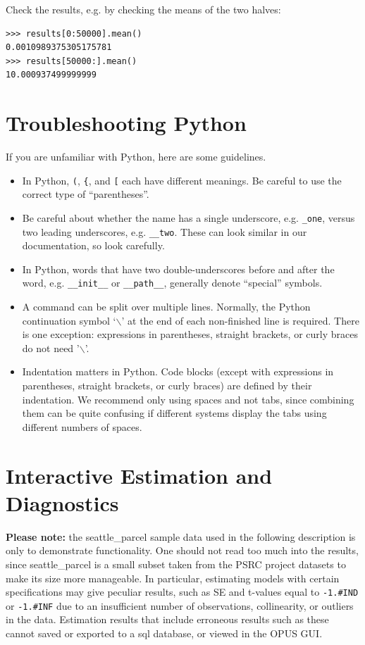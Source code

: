 Check the results, e.g. by checking the means of the two halves:
\begin{verbatim}
>>> results[0:50000].mean()
0.0010989375305175781
>>> results[50000:].mean()
10.000937499999999
\end{verbatim}

\section{Troubleshooting Python}
\label{sec:troubleshooting-python}

If you are unfamiliar with Python, here are some guidelines.

\begin{itemize}
  \item In Python, \verb|(|, \verb|{|, and \verb|[| each have different
  meanings.  Be careful to use the correct type of ``parentheses''.
  \item Be careful about whether the name has a single underscore, e.g.
  \verb|_one|, versus two leading underscores, e.g. \verb|__two|.  These can
  look similar in our documentation, so look carefully.
  \item In Python, words that have two double-underscores before and after the
  word, e.g. \verb|__init__| or \verb|__path__|, generally denote ``special''
  symbols.
  \item A command can be split over multiple lines. Normally, the Python continuation symbol `$\backslash$'
  at the end of each non-finished line is required. There is one exception:
  expressions in parentheses, straight brackets, or curly braces do not need '$\backslash$'.
  \item Indentation matters in Python. Code blocks (except with expressions
    in parentheses, straight brackets, or curly braces) are defined by
    their indentation.  We recommend only using spaces and not tabs, since
    combining them can be quite confusing if different systems display the
    tabs using different numbers of spaces.
\end{itemize}

\section{Interactive Estimation and Diagnostics}
\label{sec:components-model-estimation}
{\bf Please note:} the seattle\_parcel sample data used in the following
description is only to demonstrate functionality.  One should not read too
much into the results, since seattle\_parcel is a small subset taken from
the PSRC project datasets to make its size more manageable.  In particular,
estimating models with certain specifications may give peculiar results,
such as SE and t-values equal to \verb|-1.#IND| or \verb|-1.#INF| due to
an insufficient number of observations, collinearity, or outliers in the
data.  Estimation results that include erroneous results such as these
cannot saved or exported to a sql database, or viewed in the OPUS GUI\@.

